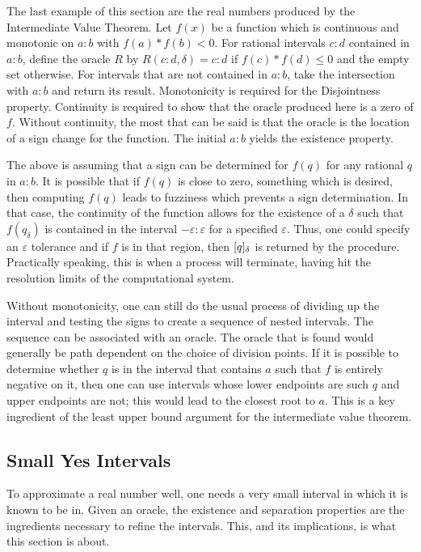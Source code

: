 \documentclass[12pt]{article}
\begin{document}
The last example of this section are the real numbers produced by the Intermediate Value Theorem. Let $f(x)$ be a function which is continuous and monotonic on $a:b$ with $f(a)*f(b) < 0$. For rational intervals $c:d$ contained in $a:b$, define the oracle $R$ by $R(c:d, \delta) = c:d$ if $f(c)*f(d) \leq 0$ and the empty set otherwise. For intervals that are not contained in $a:b$, take the intersection with $a:b$ and return its result. Monotonicity is required for the Disjointness property. Continuity is required to show that the oracle produced here is a zero of $f$. Without continuity, the most that can be said is that the oracle is the location of a sign change for the function. The initial $a:b$ yields the existence property. 

The above is assuming that a sign can be determined for $f(q)$ for any rational $q$ in $a:b$. It is possible that if $f(q)$ is close to zero, something which is desired, then computing $f(q)$ leads to fuzziness which prevents a sign determination. In that case, the continuity of the function allows for the existence of a $\delta$ such that $f(q_{\delta})$ is contained in the interval $-\varepsilon:\varepsilon$ for a specified $\varepsilon$. Thus, one could specify an $\varepsilon$ tolerance and if $f$ is in that region, then $[q]_{\delta}$ is returned by the procedure. Practically speaking, this is when a process will terminate, having hit the resolution limits of the computational system. 

Without monotonicity, one can still do the usual process of dividing up the interval and testing the signs to create a sequence of nested intervals. The sequence can be associated with an oracle. The oracle that is found would generally be path dependent on the choice of division points. If it is possible to determine whether $q$ is in the interval that contains $a$ such that $f$ is entirely negative on it, then one can use intervals whose lower endpoints are such $q$ and upper endpoints are not; this would lead to the closest root to $a$. This is a key ingredient of the least upper bound argument for the intermediate value theorem. 

\subsection{Small Yes Intervals}

To approximate a real number well, one needs a very small interval in which it is known to be in. Given an oracle, the existence and separation properties are the ingredients necessary to refine the intervals. This, and its implications, is what this section is about. 
\end{document}
